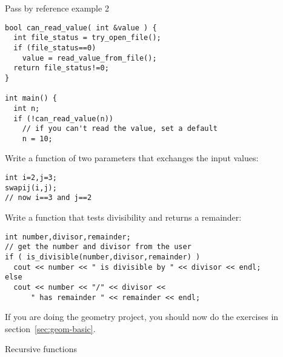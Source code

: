 \begin{block}{Pass by reference example 2}
  \label{sl:pass-reference2}
\begin{verbatim}
bool can_read_value( int &value ) {
  int file_status = try_open_file();
  if (file_status==0) 
    value = read_value_from_file();
  return file_status!=0;
}

int main() {
  int n;
  if (!can_read_value(n))
    // if you can't read the value, set a default
    n = 10;
\end{verbatim}
\end{block}

\begin{exercise}
  \label{ex:swap}
  Write a function  of two parameters that exchanges the input values:
\begin{verbatim}
int i=2,j=3;
swapij(i,j);
// now i==3 and j==2
\end{verbatim}
\end{exercise}

\begin{exercise}
  \label{ex:div-remain}
  Write a function that tests divisibility and returns a remainder:

{\small
\begin{verbatim}
int number,divisor,remainder;
// get the number and divisor from the user
if ( is_divisible(number,divisor,remainder) )
  cout << number << " is divisible by " << divisor << endl;
else
  cout << number << "/" << divisor <<
      " has remainder " << remainder << endl;
\end{verbatim}
}
\end{exercise}

If you are doing the geometry project, you should now do the exercises
in section~\ref{sec:geom-basic}.

 {Recursive functions}
\label{sec:recursion}

